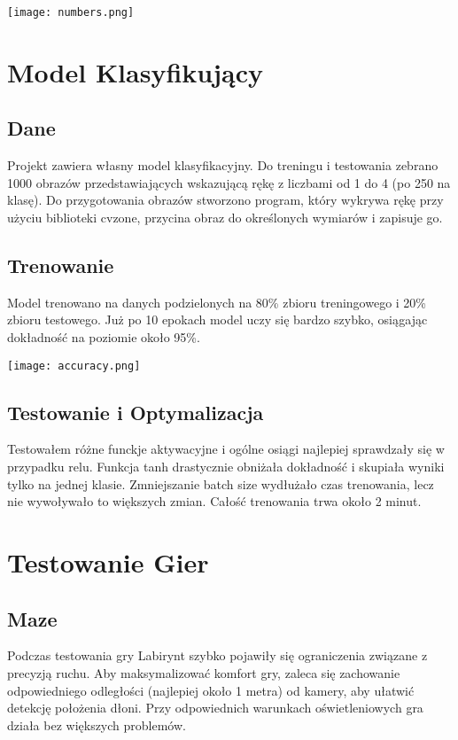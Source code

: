\documentclass{article}
\begin{document}
\texttt{[image: numbers.png]}

\section{Model Klasyfikujący}
\subsection{Dane}
Projekt zawiera własny model klasyfikacyjny. Do treningu i testowania zebrano 1000 obrazów przedstawiających wskazującą rękę z liczbami od 1 do 4 (po 250 na klasę). Do przygotowania obrazów stworzono program, który wykrywa rękę przy użyciu biblioteki cvzone, przycina obraz do określonych wymiarów i zapisuje go.

\subsection{Trenowanie}
Model trenowano na danych podzielonych na 80\% zbioru treningowego i 20\% zbioru testowego. Już po 10 epokach model uczy się bardzo szybko, osiągając dokładność na poziomie około 95\%.

\texttt{[image: accuracy.png]}

\subsection{Testowanie i Optymalizacja}
Testowałem różne funckje aktywacyjne i ogólne osiągi najlepiej sprawdzały się w przypadku relu. Funkcja tanh drastycznie obniżała dokładność i skupiała wyniki tylko na jednej klasie. Zmniejszanie batch size wydłużało czas trenowania, lecz nie wywoływało to większych zmian. Całość trenowania trwa około 2 minut.

\section{Testowanie Gier}
\subsection{Maze}
Podczas testowania gry Labirynt szybko pojawiły się ograniczenia związane z precyzją ruchu. Aby maksymalizować komfort gry, zaleca się zachowanie odpowiedniego odległości (najlepiej około 1 metra) od kamery, aby ułatwić detekcję położenia dłoni. Przy odpowiednich warunkach oświetleniowych gra działa bez większych problemów.
\end{document}
